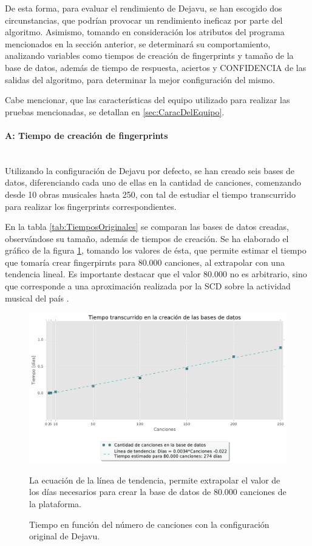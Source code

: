 De esta forma, para evaluar el rendimiento de Dejavu, se han escogido dos circunstancias, que podrían provocar un rendimiento ineficaz por parte del algoritmo. Asimismo, tomando en consideración los atributos del programa mencionados en la sección anterior, se determinará su comportamiento, analizando variables como tiempos de creación de fingerprints y tamaño de la base de datos, además de tiempo de respuesta, aciertos y CONFIDENCIA de las salidas del algoritmo, para determinar la mejor configuración del mismo.

Cabe mencionar, que las características del equipo utilizado para realizar las pruebas mencionadas, se detallan en \ref{sec:CaracDelEquipo}.

\paragraph{A: Tiempo de creación de fingerprints}\label{parrrafoTiempoCreacionF}\mbox{}\\

Utilizando la configuración de Dejavu por defecto, se han creado seis bases de datos, diferenciando cada uno de ellas en la cantidad de canciones, comenzando desde 10 obras musicales hasta 250, con tal de estudiar el tiempo transcurrido para realizar los fingerprints correspondientes.


En la tabla \ref{tab:TiemposOriginales} se comparan las bases de datos creadas, observándose su tamaño, además de tiempos de creación. Se ha elaborado el gráfico de la figura \ref{fig:TiempoFingerprintOriginales}, tomando los valores de ésta, que permite estimar el tiempo que tomaría crear fingerpirnts para 80.000 canciones, al extrapolar con una tendencia lineal. Es importante destacar que el valor 80.000 no es arbitrario, sino que corresponde a una aproximación realizada por la SCD sobre la actividad musical del país \cite{NumCanciones80k}.


\begin{figure}[h!]
    \centering
    \includegraphics[scale=0.6]{graficos/TiempoFingerprintOriginales.pdf}
    \caption{Tiempo en función del número de canciones con la configuración original de Dejavu.}{La ecuación de la línea de tendencia, permite extrapolar el valor de los días necesarios para crear la base de datos de 80.000 canciones de la plataforma.}
    \label{fig:TiempoFingerprintOriginales}
\end{figure}


